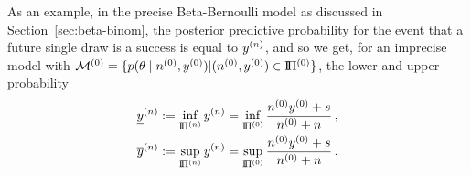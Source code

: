 As an example, in the precise Beta-Bernoulli model as discussed in Section~\ref{sec:beta-binom},
the posterior predictive probability %
for the event that a future single draw is a success is equal to $y^{(n)}$, and so we get,
for an imprecise model with $\mathcal{M}^{(0)} = \{p(\theta\mid n^{(0)}, y^{(0)}) \vert (n^{(0)}, y^{(0)}) \in \text{I}\!\Pi^{(0)}\}$,
the lower and upper probability
\begin{align*}
\underline{y}^{(n)} &:= \inf_{\text{I}\!\Pi^{(n)}} y^{(n)} = \inf_{\text{I}\!\Pi^{(0)}} \frac{n^{(0)}y^{(0)} + s}{n^{(0)} +n}\,, \\
\overline{y}^{(n)} &:= \sup_{\text{I}\!\Pi^{(n)}} y^{(n)} = \sup_{\text{I}\!\Pi^{(0)}} \frac{n^{(0)}y^{(0)} + s}{n^{(0)} +n}\,.
\end{align*}

